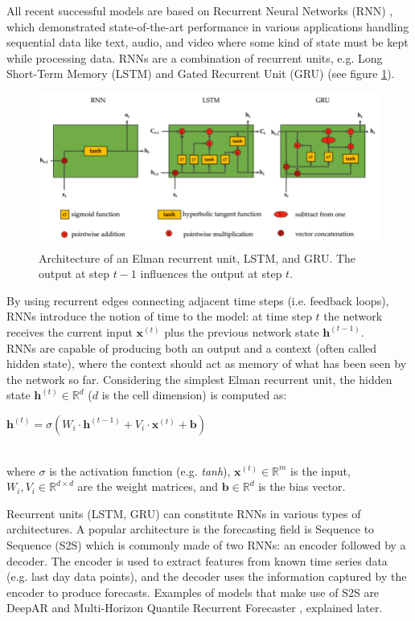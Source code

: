 \documentclass[a4paper]{article} %
\begin{document}
	All recent successful models are based on Recurrent Neural Networks (RNN) \cite{RNN, RNNForecasting}, which demonstrated state-of-the-art performance in various applications handling sequential data like text, audio, and video where some kind of state must be kept while processing data. RNNs are a combination of recurrent units, e.g. Long Short-Term Memory (LSTM) and Gated Recurrent Unit (GRU) (see figure \ref{fig:lstmgru}). 
	\begin{figure}[H]
		\includegraphics[width=\linewidth]{img/rnns.png}
		\caption{Architecture of an Elman recurrent unit, LSTM, and GRU. The output at step $t-1$ influences the output at step $t$.}
		\label{fig:lstmgru}
	\end{figure}
	By using recurrent edges connecting adjacent time steps (i.e. feedback loops), RNNs introduce the notion of time to the model: at time step $t$ the network receives the current input $\pmb{x}^{(t)}$ plus the previous network state $\pmb{h}^{(t-1)}$. \\
	RNNs are capable of producing both an output and a context (often called hidden state), where the context should act as memory of what has been seen by the network so far. Considering the simplest Elman recurrent unit, the hidden state $\pmb{h}^{(t)} \in \mathbb{R}^d$ ($d$ is the cell dimension) is computed as:\\
	\centerline{
	$
	\pmb{h}^{(t)} = \sigma(W_i \cdot \pmb{h}^{(t-1)} + V_i \cdot \pmb{x}^{(t)} + \pmb{b})
	$
	}\\
	where $\sigma$ is the activation function (e.g. \textit{tanh}), $\pmb{x}^{(t)} \in \mathbb{R}^m$ is the input, $W_i, V_i \in \mathbb{R}^{d \times d}$ are the weight matrices, and $\pmb{b} \in \mathbb{R}^{d}$ is the bias vector.
	
	Recurrent units (LSTM, GRU) can constitute RNNs in various types of architectures. A popular architecture is the forecasting field is Sequence to Sequence (S2S) \cite{seq2seq} which is commonly made of two RNNs: an encoder followed by a decoder. The encoder is used to extract features from known time series data (e.g. last day data points), and the decoder uses the information captured by the encoder to produce forecasts. Examples of models that make use of S2S are DeepAR \cite{DeepAR} and Multi-Horizon Quantile Recurrent Forecaster \cite{MQCNN}, explained later.
	
\end{document}
